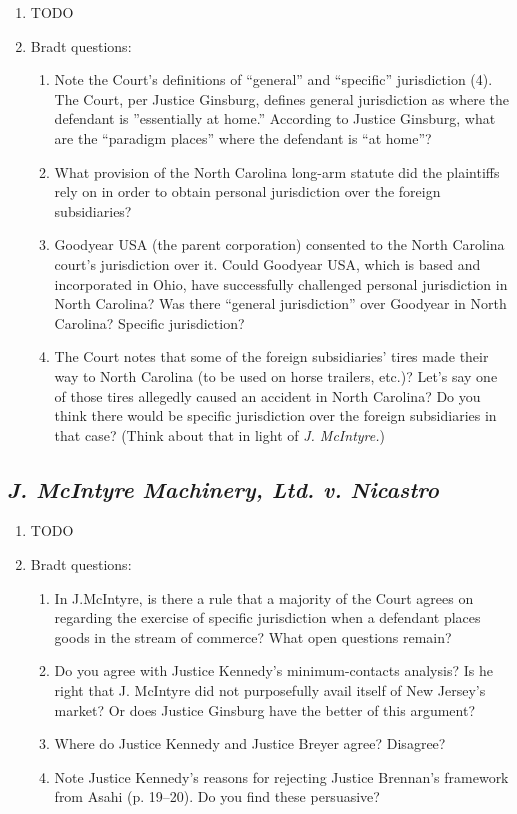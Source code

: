 \begin{enumerate}
    \item TODO
    \item Bradt questions:
    \begin{enumerate}
        \item Note the Court's definitions of ``general'' and ``specific'' jurisdiction (4). The Court, per Justice Ginsburg, defines general jurisdiction as where the defendant is ''essentially at home.'' According to Justice Ginsburg, what are the ``paradigm places'' where the defendant is ``at home''?
        \item What provision of the North Carolina long-arm statute did the plaintiffs rely on in order to obtain personal jurisdiction over the foreign subsidiaries?
        \item Goodyear USA (the parent corporation) consented to the North Carolina court's jurisdiction over it. Could Goodyear USA, which is based and incorporated in Ohio, have successfully challenged personal jurisdiction in North Carolina? Was there ``general jurisdiction'' over Goodyear in North Carolina? Specific jurisdiction?
        \item The Court notes that some of the foreign subsidiaries' tires made their way to North Carolina (to be used on horse trailers, etc.)? Let's say one of those tires allegedly caused an accident in North Carolina? Do you think there would be specific jurisdiction over the foreign subsidiaries in that case? (Think about that in light of \emph{J. McIntyre.})
    \end{enumerate}
\end{enumerate}

\subsection{\emph{J. McIntyre Machinery, Ltd. v. Nicastro}}

\begin{enumerate}
    \item TODO
    \item Bradt questions:
    \begin{enumerate}
        \item In J.McIntyre, is there a rule that a majority of the Court agrees on regarding the exercise of specific jurisdiction when a defendant places goods in the stream of commerce? What open questions remain?
        \item Do you agree with Justice Kennedy's minimum-contacts analysis? Is he right that J. McIntyre did not purposefully avail itself of New Jersey's market? Or does Justice Ginsburg have the better of this argument?
        \item Where do Justice Kennedy and Justice Breyer agree? Disagree?
        \item Note Justice Kennedy's reasons for rejecting Justice Brennan's framework from Asahi (p. 19--20). Do you find these persuasive?
    \end{enumerate}
\end{enumerate}

